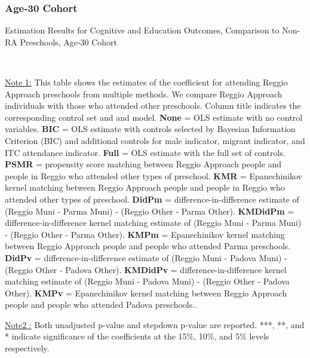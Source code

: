 \subsubsection{Age-30 Cohort}
\begin{table}[H] \caption{Estimation Results for Cognitive and Education Outcomes, Comparison to Non-RA Preschools, Age-30 Cohort} \label{ols-CN-adult30-reg-other}
\scalebox{0.6}{}
\vspace{1ex} \\
\footnotesize\raggedright{\underline{Note 1:} This table shows the estimates of the coefficient for attending Reggio Approach preschools from multiple methods. We compare Reggio Approach individuals with those who attended other preschools. Column title indicates the corresponding control set and and model. \textbf{None} = OLS estimate with no control variables. \textbf{BIC} = OLS estimate with controls selected by Bayesian Information Criterion (BIC) and additional controls for male indicator, migrant indicator, and ITC attendance indicator. \textbf{Full} = OLS estimate with the full set of controls. \textbf{PSMR} =  propensity score matching between Reggio Approach people and people in Reggio who attended other types of preschool. \textbf{KMR} = Epanechinikov kernel matching between Reggio Approach people and people in Reggio who attended other types of preschool. \textbf{DidPm} = difference-in-difference estimate of (Reggio Muni - Parma Muni) - (Reggio Other - Parma Other). \textbf{KMDidPm} = difference-in-difference kernel matching estimate of (Reggio Muni - Parma Muni) - (Reggio Other - Parma Other).   \textbf{KMPm} = Epanechinikov kernel matching between Reggio Approach people and people who attended Parma preschools. \textbf{DidPv} = difference-in-difference estimate of (Reggio Muni - Padova Muni) - (Reggio Other - Padova Other). \textbf{KMDidPv} = difference-in-difference kernel matching estimate of (Reggio Muni - Padova Muni) - (Reggio Other - Padova Other).  \textbf{KMPv} = Epanechinikov kernel matching between Reggio Approach people and people who attended Padova preschools..} 

\footnotesize\raggedright{\underline{Note2 :} Both unadjusted p-value and stepdown p-value are reported. ***, **, and * indicate significance of the coefficients at the 15\%, 10\%, and 5\% levels respectively.}
\end{table}

